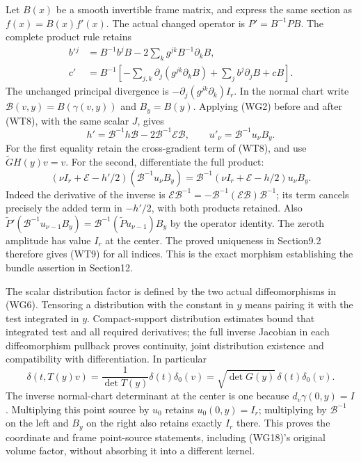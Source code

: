 \documentclass[
  11pt,
]{article}
\begin{document}
Let \(B(x)\) be a smooth invertible frame matrix, and express the same
section as \(f(x)=B(x)f'(x)\). The actual changed operator is
\(P'=B^{-1}PB\). The complete product rule retains \[
\begin{split}
 b'{}^j&=B^{-1}b^jB-2\sum_k g^{jk}B^{-1}\partial_kB,\\
 c'&=B^{-1}\left[-\sum_{j,k}\partial_j(g^{jk}\partial_kB)
                   +\sum_j b^j\partial_jB+cB\right].
\end{split}
 \tag{WT8}
\] The unchanged principal divergence is
\(-\partial_j(g^{jk}\partial_k)I_r\). In the normal chart write
\(\mathcal B(v,y)=B(\gamma(v,y))\) and \(B_y=B(y)\). Applying (WG2)
before and after (WT8), with the same scalar \(J\), gives \[
 h'=\mathcal B^{-1}h\mathcal B
                -2\mathcal B^{-1}\mathcal E\mathcal B,\qquad
 u'_\nu=\mathcal B^{-1}u_\nu B_y .
 \tag{WT9}
\] For the first equality retain the cross-gradient term of (WT8), and
use \(\widetilde G H(y)v=v\). For the second, differentiate the full
product: \[
 (\nu I_r+\mathcal E-h'/2)
       (\mathcal B^{-1}u_\nu B_y)
  =\mathcal B^{-1}(\nu I_r+\mathcal E-h/2)u_\nu B_y .
 \tag{WT10}
\] Indeed the derivative of the inverse is
\(\mathcal E\mathcal B^{-1}=-\mathcal B^{-1}(\mathcal E\mathcal B)\mathcal B^{-1}\);
its term cancels precisely the added term in \(-h'/2\), with both
products retained. Also
\(\widetilde P'(\mathcal B^{-1}u_{\nu-1}B_y)=\mathcal B^{-1}(\widetilde Pu_{\nu-1})B_y\)
by the operator identity. The zeroth amplitude has value \(I_r\) at the
center. The proved uniqueness in Section9.2 therefore gives (WT9) for
all indices. This is the exact morphism establishing the bundle
assertion in Section12.

The scalar distribution factor is defined by the two actual
diffeomorphisms in (WG6). Tensoring a distribution with the constant in
\(y\) means pairing it with the test integrated in \(y\).
Compact-support distribution estimates bound that integrated test and
all required derivatives; the full inverse Jacobian in each
diffeomorphism pullback proves continuity, joint distribution existence
and compatibility with differentiation. In particular \[
 \delta(t,T(y)v)=\frac1{\det T(y)}\delta(t)\delta_0(v)
               =\sqrt{\det G(y)}\,\delta(t)\delta_0(v).
 \tag{WT11}
\] The inverse normal-chart determinant at the center is one because
\(d_v\gamma(0,y)=I\). Multiplying this point source by \(u_0\) retains
\(u_0(0,y)=I_r\); multiplying by \(\mathcal B^{-1}\) on the left and
\(B_y\) on the right also retains exactly \(I_r\) there. This proves the
coordinate and frame point-source statements, including (WG18)'s
original volume factor, without absorbing it into a different kernel.
\end{document}
